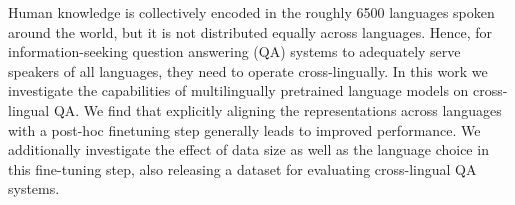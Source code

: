 Human knowledge is collectively encoded in the roughly 6500 languages spoken around the world, but it is not distributed equally across languages. Hence, for information-seeking question answering (QA) systems to adequately serve speakers of all languages, they need to operate cross-lingually. In this work we investigate the capabilities of multilingually pretrained language models on cross-lingual QA. We find that explicitly aligning the representations across languages with a post-hoc finetuning step generally leads to improved performance. We additionally investigate the effect of data size as well as the language choice in this fine-tuning step, also releasing a dataset for evaluating cross-lingual QA systems.
